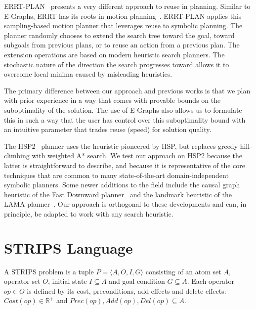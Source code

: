 \documentclass[letterpaper]{article}
\begin{document}
ERRT-PLAN~\cite{workshop-icaps12-errtplan} presents a very different 
approach to reuse in planning. 
Similar to E-Graphs, ERRT has its roots in motion planning~\cite{Bruce:2002}.
ERRT-PLAN applies this sampling-based motion planner that leverages 
reuse to symbolic planning. The planner randomly chooses to extend 
the search tree toward the goal, toward subgoals from previous 
plans, or to reuse an action from a previous plan. 
The extension operations are based on modern heuristic search
planners.
The stochastic nature of the direction the search progresses toward
allows it to overcome local minima caused by misleading heuristics.

The primary difference between our approach and previous works 
is that we plan with prior experience in a way that comes with provable
bounds on the suboptimality of the solution. The use of E-Graphs also
allows us to formulate this in such a way that the user has control over
this suboptimality bound with an intuitive parameter that trades
reuse (speed) for solution quality.

The HSP2~\cite{bonet2001planning} planner uses the heuristic pioneered by HSP, but replaces greedy hill-climbing with weighted A* search.
We test our approach on HSP2 because the latter is straightforward to describe, and because it is representative of the core techniques that are common to many state-of-the-art domain-independent symbolic planners.
Some newer additions to the field include the causal graph heuristic of the Fast Downward planner~\cite{helmert2006fast} and the landmark heuristic of the LAMA planner~\cite{richter2010lama}. Our approach is orthogonal to these developments and can, in principle, be adapted to work with any search heuristic.

\section{STRIPS Language}

A STRIPS problem is a tuple $P = \langle A,O,I,G\rangle$ consisting of an atom set $A$, operator set $O$, initial state $I \subseteq A$ and goal condition $G \subseteq A$.
Each operator $op\in O$ is defined by its cost, preconditions, add effects and delete effects: $Cost(op) \in \mathbb{R}^+$ and $Prec(op),Add(op),Del(op) \subseteq A$.
\end{document}

